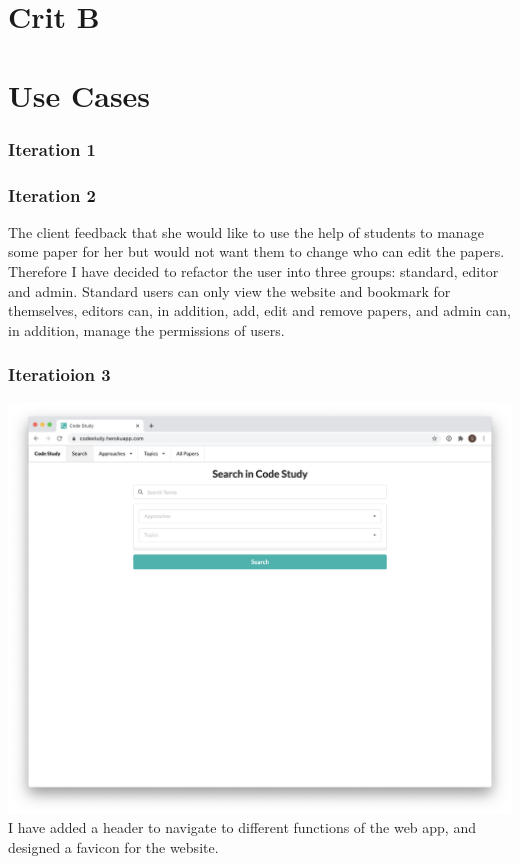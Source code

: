 \documentclass[
]{article}
\author{}
\date{}
\begin{document}
\hypertarget{crit-b}{%
\section{Crit B}\label{crit-b}}

\hypertarget{use-cases}{%
\section{Use Cases}\label{use-cases}}

\hypertarget{iteration-1}{%
\subsubsection{Iteration 1}\label{iteration-1}}

\hypertarget{iteration-2}{%
\subsubsection{Iteration 2}\label{iteration-2}}

The client feedback that she would like to use the help of students to
manage some paper for her but would not want them to change who can edit
the papers. Therefore I have decided to refactor the user into three
groups: standard, editor and admin. Standard users can only view the
website and bookmark for themselves, editors can, in addition, add, edit
and remove papers, and admin can, in addition, manage the permissions of
users.

\hypertarget{iteratioion-3}{%
\subsubsection{Iteratioion 3}\label{iteratioion-3}}

\includegraphics{img/landing page iteration 3.png}\\
I have added a header to navigate to different functions of the web app,
and designed a favicon for the website.
\end{document}
